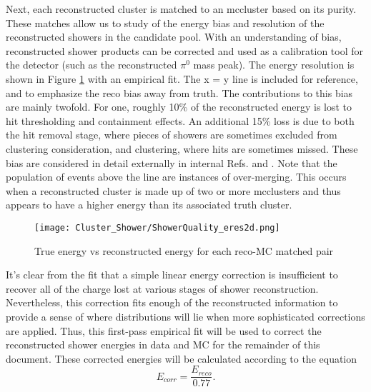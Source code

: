 \par  Next, each reconstructed cluster is matched to an mccluster based on its purity. These matches allow us to study of the energy bias and resolution of the reconstructed showers in the candidate pool.  With an understanding of bias, reconstructed shower products can be corrected and used as a calibration tool for the detector (such as the reconstructed $\pi^0$ mass peak).  The energy resolution is shown in Figure \ref{fig:showerquality_eres} with an empirical fit. The x = y line is included for reference, and to emphasize the reco bias away from truth.  The contributions to this bias are mainly twofold. For one, roughly 10\% of the reconstructed energy is lost to hit thresholding and containment effects. An additional 15\% loss is due to both the hit removal stage, where pieces of showers are sometimes excluded from clustering consideration, and clustering, where hits are sometimes missed. These bias are considered in detail externally in internal Refs. \cite{bib:davidc_hitthresholding} and \cite{bib:davidc_missingE}.  Note that the population of events above the line are instances of over-merging. This occurs when a reconstructed cluster is made up of two or more mcclusters and thus appears to have a higher energy than its associated truth cluster. 

\begin{figure}[H]
\centering
\texttt{[image: Cluster\_Shower/ShowerQuality\_eres2d.png]}
\caption{True energy vs reconstructed energy for each reco-MC matched pair}
\label{fig:showerquality_eres}
\end{figure}


\par It's clear from the fit that a simple linear energy correction is insufficient to recover all of the charge lost at various stages of shower reconstruction.  Nevertheless, this correction fits enough of the reconstructed information to provide a sense of where distributions will lie when more sophisticated corrections are applied. Thus, this first-pass empirical fit will be used to correct the reconstructed shower energies in data and MC for the remainder of this document. These corrected energies will be calculated according to the equation
\begin{equation}
\label{eq:ecorr}
E_{corr} = \frac{E_{reco}}{0.77} .
\end{equation}

